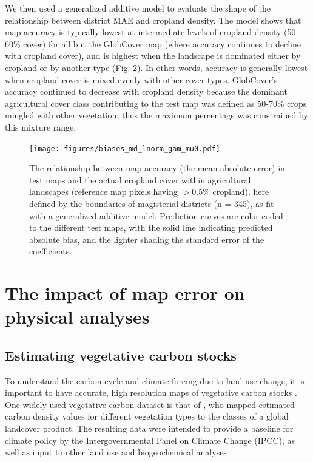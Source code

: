 \documentclass{pnastwo}
\begin{document}
\begin{article}
We then used a generalized additive model to evaluate the shape of the relationship between district MAE and cropland density. The model shows that map accuracy is typically lowest at intermediate levels of cropland density (50-60\% cover) for all but the GlobCover map (where accuracy continues to decline with cropland cover), and is highest when the landscape is dominated either by cropland or by another type (Fig. 2). In other words, accuracy is generally lowest when cropland cover is mixed evenly with other cover types. GlobCover's accuracy continued to decrease with cropland density because the dominant agricultural cover class contributing to the test map was defined as 50-70\% crops mingled with other vegetation, thus the maximum percentage was constrained by this mixture range.  

\vspace{-0.75 cm}
\begin{figure}[h]
\centerline{\texttt{[image: figures/biases\_md\_lnorm\_gam\_mu0.pdf]}}
\caption{The relationship between map accuracy (the mean absolute error) in test maps and the actual cropland cover within agricultural landscapes (reference map pixels having $>$0.5\% cropland), here defined by the boundaries of magisterial districts (n = 345), as fit with a generalized additive model. Prediction curves are color-coded to the different test maps, with the solid line indicating predicted absolute bias, and the lighter shading the standard error of the coefficients.}\label{afoto2}
\end{figure}

\section{The impact of map error on physical analyses}
\subsection{Estimating vegetative carbon stocks}
To understand the carbon cycle and climate forcing due to land use change, it is important to have accurate, high resolution maps of vegetative carbon stocks \cite[][]{searchinger_high_2015}. One widely used vegetative carbon dataset is that of \cite{ruesch_new_2008}, who mapped estimated carbon density values for different vegetation types to the classes of a global landcover product. The resulting data were intended to provide a baseline for climate policy by the Intergovernmental Panel on Climate Change (IPCC), as well as input to other land use and biogeochemical analyses \cite{ruesch_new_2008}. 


\end{article}
\end{document}
